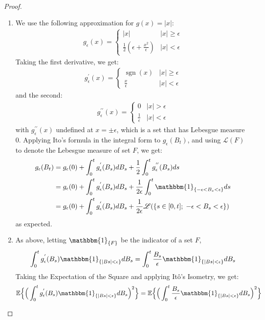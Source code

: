\documentclass[11pt]{article}
\newcommand\abs[1]{\left|#1\right|}
\newcommand{\ind}[1]{\mathbbm{1}_{\{#1\}}}
\newcommand{\E}{\mathbb{E}}
\newcommand{\geps}{\epsilon}
\DeclareMathOperator{\sgn}{sgn}
\begin{document}
\begin{proof}
\begin{enumerate}
\item We use the following approximation for $g(x)= \abs{x}$:
\begin{align*}
g_\geps (x)= 
\begin{cases} 
\abs{x} & \abs{x}\geq\geps \\
\frac{1}{2}(\geps + \frac{x^2}{\geps}) & \abs{x}<\geps
\end{cases}
\end{align*}
Taking the first derivative, we get:
\begin{align*}
g_{\geps}^{\prime} (x)= 
\begin{cases}
\sgn{(x)} & \abs{x} \geq \geps \\
\frac{x}{\geps} & \abs{x}<\geps
\end{cases}
\end{align*}
and the second:
\begin{align*}
g_{\geps}^{\prime \prime} (x)= 
\begin{cases}
0& \abs{x} > \geps \\
\frac{1}{\geps} & \abs{x}<\geps
\end{cases}
\end{align*}
with $g_{\geps}^{\prime \prime} (x)$ undefined at $x=\pm \geps$, which is a set that has Lebesgue measure 0.
Applying Ito's formula in the integral form to $g_\geps (B_t)$, and using $\mathscr{L}(F)$ to denote the Lebesgue measure of set $F$, we get:
\newcommand{\gtemp}{g_\geps}
\begin{align*}
\gtemp(B_t) &= \gtemp(0) + \int_0^t \gtemp^{'}(B_s) dB_s + \frac{1}{2} \int_0^t \gtemp^{''}(B_s) ds\\
&= \gtemp(0) + \int_0^t \gtemp^{'}(B_s) dB_s +\frac{1}{2 \geps} \int_0^t \ind{-\geps<B_s<\geps} ds  \\
&= \gtemp(0) + \int_0^t \gtemp^{'}(B_s) dB_s + \frac{1}{2 \geps}\mathscr{L}( \{s \in [0,t]; \; -\geps < B_s < \geps\})
\end{align*}
as expected.
\item As above, letting $ \ind{F}$ be the indicator of a set $F$,
\begin{align*}
\int_0^t \gtemp^{'} (B_s) \ind{\abs{Bs}<\geps} dB_s = \int_0^t \frac{B_s}{\geps} \ind{\abs{Bs}<\geps} dB_s
\end{align*}
Taking the Expectation of the Square and applying It\^o's Isometry, we get: 
\begin{align*}
\E \Big\{ \Big(  \int_0^t \gtemp^{'} (B_s) \ind{\abs{Bs}<\geps} dB_s \Big)^2 \Big\} &= \E \Big\{ \Big( \int_0^t \frac{B_s}{\geps} \ind{\abs{Bs}<\geps} dB_s  \Big)^2 \Big\} \\

\end{align*}
\end{enumerate}
\end{proof}
\end{document}
